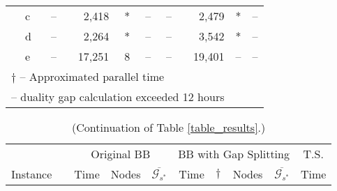 \documentclass[11.5pt]{article}
\begin{document}
\begin{table}[H]
\begin{tabular}{l|l|rrr|rrrr|r}
                  & c & --    & 2,418 & *  & --     & --    & 2,479 & *    & --\\
                  & d & --    & 2,264 & *  & --     & --    & 3,542 & *    & --\\
                  & e & --    & 17,251& 8  & --     & --    & 19,401& --   & --\\
\bottomrule
\multicolumn{8}{l}{\scriptsize $\dagger$ -- Approximated parallel time}\\
\multicolumn{8}{l}{\scriptsize* -- duality gap calculation exceeded 12 hours} 
\end{tabular}
\end{table}


 \begin{table}[H]
\centering
\caption{(Continuation of Table \ref{table_results}.)}\label{table_results2}
\begin{tabular}{l|l|rrr|rrrr|r}
\toprule
 &  & \multicolumn{3}{c}{Original BB}  & \multicolumn{4}{c}{BB with Gap Splitting} %
 & \multicolumn{1}{c}{ T.S.} 	\\ 
\cmidrule(r){3-5}
\cmidrule(r){6-9}
\cmidrule(r){10-10}
Instance &  & Time & Nodes & $\overline{\mathcal{G}_{s^*}}$ & Time & $\dagger$ & Nodes & $\overline{\mathcal{G}_{s^*}}$& Time \\
\midrule

\end{tabular}
\end{table}
\end{document}
